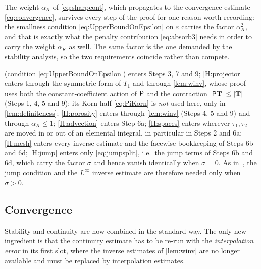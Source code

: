 \begin{remark}\label{rem:sharper}
The weight $\alpha_K$ of \eqref{eq:sharpcont}, which propagates to the convergence estimate
\eqref{eq:convergence}, survives every step of the proof for one reason worth recording: the
smallness condition \eqref{eq:UpperBoundOnEpsilon} on $\varepsilon$ carries the factor
$\alpha_K^2$, and that is exactly what the penalty contribution \eqref{eq:absorb3} needs in
order to carry the weight $\alpha_K$ as well. The same factor is the one demanded by the
stability analysis, so the two requirements coincide rather than compete.
\end{remark}

\begin{remark}\label{rem:hypotheses}
 (condition \eqref{eq:UpperBoundOnEpsilon}) enters Steps 3, 7 and 9;
\cref{H:projector} enters through the symmetric form of $T_1$ and through
\cref{lem:winv}, whose proof uses both the constant{\hyp}coefficient action of
$\mathsf{P}$ and the contraction $|\mathsf{P}\mathbf{T}|\le|\mathbf{T}|$ (Steps 1, 4, 5 and 9);
its Korn half \cref{eq:PiKorn} is \emph{not} used here, only in \cref{lem:definiteness};
\cref{H:porosity} enters through \cref{lem:winv} (Steps 4, 5 and 9) and through
$\alpha_K\le1$; \cref{H:advection} enters Step 6a; \cref{H:spaces} enters wherever
$\tau_1,\tau_2$ are moved in or out of an elemental integral, in particular in Steps 2 and 6a;
\cref{H:mesh} enters every inverse estimate and the facewise bookkeeping of Steps 6b and 6d;
\cref{H:jump} enters only \eqref{eq:jumpsplit}, i.e.\ the jump terms of Steps 6b and 6d, which
carry the factor $\sigma$ and hence vanish identically when $\sigma=0$. As
in~\cite{codina2001stabilized}, the jump condition and the $L^\infty$ inverse estimate are
therefore needed only when $\sigma>0$.
\end{remark}

\subsection{Convergence}\label{sec:convergence}
Stability and continuity are now combined in the standard way. The only new ingredient is that
the continuity estimate has to be re-run with the \emph{interpolation error} in its first slot,
where the inverse estimates of \cref{lem:winv} are no longer available and must be replaced by
interpolation estimates.

